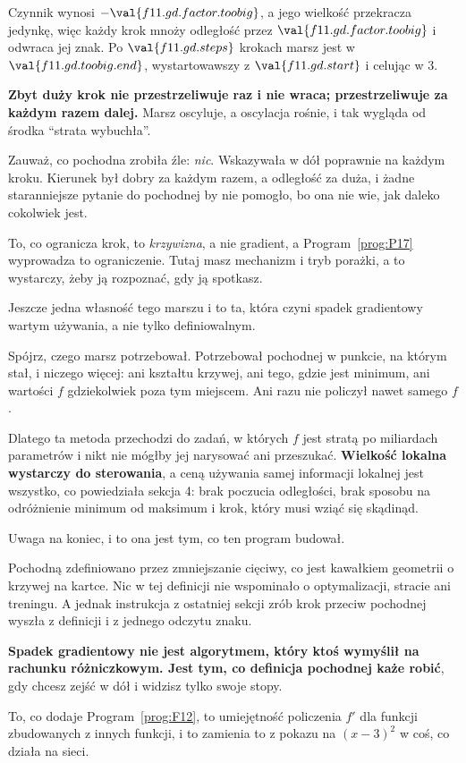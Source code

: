 \begin{fr}
Czynnik wynosi $-\val{f11.gd.factor.toobig}$, a jego wielkość przekracza
jedynkę, więc każdy krok mnoży odległość przez $\val{f11.gd.factor.toobig}$ i
odwraca jej znak. Po $\val{f11.gd.steps}$ krokach marsz jest w
$\val{f11.gd.toobig.end}$, wystartowawszy z $\val{f11.gd.start}$ i celując
w $3$.

\begin{trapbox}
\textbf{Zbyt duży krok nie przestrzeliwuje raz i nie wraca; przestrzeliwuje za
każdym razem dalej.} Marsz oscyluje, a oscylacja rośnie, i tak wygląda od
środka \enquote{strata wybuchła}.

Zauważ, co pochodna zrobiła źle: \emph{nic}. Wskazywała w dół poprawnie na
każdym kroku. Kierunek był dobry za każdym razem, a odległość za duża, i żadne
staranniejsze pytanie do pochodnej by nie pomogło, bo ona nie wie, jak daleko
cokolwiek jest.

To, co ogranicza krok, to \emph{krzywizna}, a nie gradient, a
Program~\ref{prog:P17} wyprowadza to ograniczenie. Tutaj masz mechanizm i tryb
porażki, a to wystarczy, żeby ją rozpoznać, gdy ją spotkasz.
\end{trapbox}
\end{fr}

\begin{fr}
Jeszcze jedna własność tego marszu i to ta, która czyni spadek gradientowy
wartym używania, a nie tylko definiowalnym.

Spójrz, czego marsz potrzebował. Potrzebował pochodnej w punkcie, na którym
stał, i niczego więcej: ani kształtu krzywej, ani tego, gdzie jest minimum,
ani wartości $f$ gdziekolwiek poza tym miejscem. Ani razu nie policzył nawet
samego $f$.

Dlatego ta metoda przechodzi do zadań, w których $f$ jest stratą po miliardach
parametrów i nikt nie mógłby jej narysować ani przeszukać. \textbf{Wielkość
lokalna wystarczy do sterowania}, a ceną używania samej informacji lokalnej
jest wszystko, co powiedziała sekcja 4: brak poczucia odległości, brak
sposobu na odróżnienie minimum od maksimum i krok, który musi wziąć się
skądinąd.
\end{fr}

\begin{fr}
Uwaga na koniec, i to ona jest tym, co ten program budował.

Pochodną zdefiniowano przez zmniejszanie cięciwy, co jest kawałkiem geometrii
o krzywej na kartce. Nic w tej definicji nie wspominało o optymalizacji,
stracie ani treningu. A jednak instrukcja z ostatniej sekcji \dash{} zrób krok
przeciw pochodnej \dash{} wyszła z definicji i z jednego odczytu znaku.

\textbf{Spadek gradientowy nie jest algorytmem, który ktoś wymyślił na
rachunku różniczkowym. Jest tym, co definicja pochodnej każe robić}, gdy
chcesz zejść w dół i widzisz tylko swoje stopy.

To, co dodaje Program~\ref{prog:F12}, to umiejętność policzenia $f'$ dla
funkcji zbudowanych z innych funkcji, i to zamienia to z pokazu na
$(x-3)^{2}$ w coś, co działa na sieci.
\end{fr}

